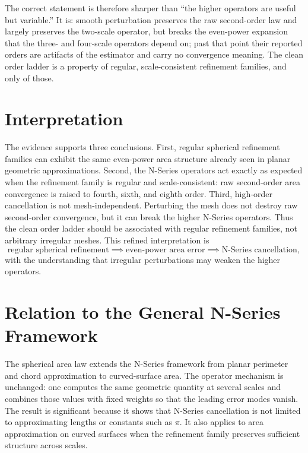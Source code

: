 \documentclass[11pt]{article}
\begin{document}
The correct statement is therefore sharper than ``the higher operators are useful but
variable.'' It is: smooth perturbation preserves the raw second-order law and largely
preserves the two-scale operator, but breaks the even-power expansion that the three- and
four-scale operators depend on; past that point their reported orders are artifacts of the
estimator and carry no convergence meaning. The clean order ladder is a property of regular,
scale-consistent refinement families, and only of those.

\section{Interpretation}
The evidence supports three conclusions. First, regular spherical refinement families can
exhibit the same even-power area structure already seen in planar geometric approximations.
Second, the N-Series operators act exactly as expected when the refinement family is regular
and scale-consistent: raw second-order area convergence is raised to fourth, sixth, and
eighth order. Third, high-order cancellation is not mesh-independent. Perturbing the mesh
does not destroy raw second-order convergence, but it can break the higher N-Series
operators. Thus the clean order ladder should be associated with regular refinement
families, not arbitrary irregular meshes. This refined interpretation is
\[
\text{regular spherical refinement} \implies \text{even-power area error} \implies
\text{N-Series cancellation},
\]
with the understanding that irregular perturbations may weaken the higher operators.

\section{Relation to the General N-Series Framework}
The spherical area law extends the N-Series framework from planar perimeter and chord
approximation to curved-surface area. The operator mechanism is unchanged: one computes the
same geometric quantity at several scales and combines those values with fixed weights so
that the leading error modes vanish. The result is significant because it shows that
N-Series cancellation is not limited to approximating lengths or constants such as $\pi$.
It also applies to area approximation on curved surfaces when the refinement family
preserves sufficient structure across scales.
\end{document}
